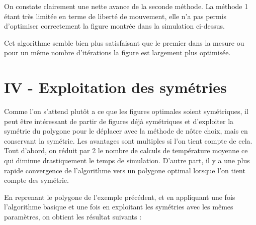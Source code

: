 \documentclass[a4paper,reqno]{article}
\newcommand{\pa}{\hspace{1cm}}
\begin{document}
\par On constate clairement une nette avance de la seconde méthode. La méthode 1 étant très limitée en terme de liberté de mouvement, elle n'a pas permis d'optimiser correctement la figure montrée dans la simulation ci-dessus. \\ 

\par Cet algorithme semble bien plus satisfaisant que le premier dans la mesure ou pour un même nombre d'itérations la figure est largement plus optimisée.



\section*{IV - Exploitation des symétries}

\pa Comme l'on s'attend plutôt a ce que les figures optimales soient symétriques, il peut être intéressant de partir de figures déjà symétriques et d'exploiter la symétrie du polygone pour le déplacer avec la méthode de nôtre choix, mais en conservant la symétrie. Les avantages sont multiples si l'on tient compte de cela. Tout d'abord, on réduit par 2 le nombre de calculs de température moyenne ce qui diminue drastiquement le temps de simulation. D'autre part, il y a une plus rapide convergence de l'algorithme vers un polygone optimal lorsque l'on tient compte des symétrie. \\ 

\par En reprenant le polygone de l'exemple précédent, et en appliquant une fois l'algorithme basique et une fois en exploitant les symétries avec les mêmes paramètres, on obtient les résultat suivants : \\ 
\end{document}

